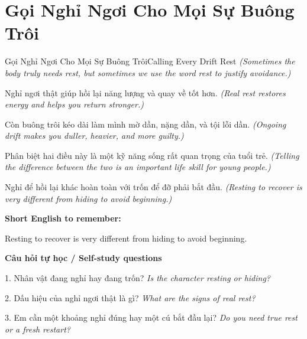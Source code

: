 \section{Gọi Nghỉ Ngơi Cho Mọi Sự Buông Trôi}
\begin{truyen}{Gọi Nghỉ Ngơi Cho Mọi Sự Buông Trôi}{Calling Every Drift Rest}
\textit{(Sometimes the body truly needs rest, but sometimes we use the word rest to justify avoidance.)}

Nghỉ ngơi thật giúp hồi lại năng lượng và quay về tốt hơn.
\textit{(Real rest restores energy and helps you return stronger.)}

Còn buông trôi kéo dài làm mình mờ dần, nặng dần, và tội lỗi dần.
\textit{(Ongoing drift makes you duller, heavier, and more guilty.)}

Phân biệt hai điều này là một kỹ năng sống rất quan trọng của tuổi trẻ.
\textit{(Telling the difference between the two is an important life skill for young people.)}

\end{truyen}

\begin{baihoc}
Nghỉ để hồi lại khác hoàn toàn với trốn để đỡ phải bắt đầu.
\textit{(Resting to recover is very different from hiding to avoid beginning.)}
\end{baihoc}

\begin{ghinhoanh}
\textbf{Short English to remember:}

Resting to recover is very different from hiding to avoid beginning.

\end{ghinhoanh}

\begin{tuhocnhanh}
\textbf{Câu hỏi tự học / Self-study questions}

1. Nhân vật đang nghỉ hay đang trốn? \textit{Is the character resting or hiding?}

2. Dấu hiệu của nghỉ ngơi thật là gì? \textit{What are the signs of real rest?}

3. Em cần một khoảng nghỉ đúng hay một cú bắt đầu lại? \textit{Do you need true rest or a fresh restart?}
\end{tuhocnhanh}
\ngancach

